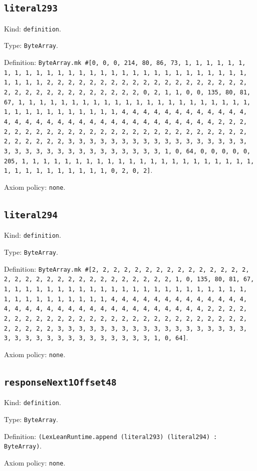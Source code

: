 \documentclass[11pt]{article}
\begin{document}
\subsection*{\texttt{literal293}}
\noindent Kind: \texttt{definition}.\par
\noindent Type: \texttt{ByteArray}.\par
\noindent Definition: \texttt{ByteArray.mk \#[0, 0, 0, 214, 80, 86, 73, 1, 1, 1, 1, 1, 1, 1, 1, 1, 1, 1, 1, 1, 1, 1, 1, 1, 1, 1, 1, 1, 1, 1, 1, 1, 1, 1, 1, 1, 1, 1, 1, 1, 2, 2, 2, 2, 2, 2, 2, 2, 2, 2, 2, 2, 2, 2, 2, 2, 2, 2, 2, 2, 2, 2, 2, 2, 2, 2, 2, 2, 2, 2, 2, 2, 0, 2, 1, 1, 0, 0, 135, 80, 81, 67, 1, 1, 1, 1, 1, 1, 1, 1, 1, 1, 1, 1, 1, 1, 1, 1, 1, 1, 1, 1, 1, 1, 1, 1, 1, 1, 1, 1, 1, 1, 1, 1, 1, 4, 4, 4, 4, 4, 4, 4, 4, 4, 4, 4, 4, 4, 4, 4, 4, 4, 4, 4, 4, 4, 4, 4, 4, 4, 4, 4, 4, 4, 4, 4, 4, 2, 2, 2, 2, 2, 2, 2, 2, 2, 2, 2, 2, 2, 2, 2, 2, 2, 2, 2, 2, 2, 2, 2, 2, 2, 2, 2, 2, 2, 2, 2, 2, 3, 3, 3, 3, 3, 3, 3, 3, 3, 3, 3, 3, 3, 3, 3, 3, 3, 3, 3, 3, 3, 3, 3, 3, 3, 3, 3, 3, 3, 3, 3, 3, 1, 0, 64, 0, 0, 0, 0, 0, 205, 1, 1, 1, 1, 1, 1, 1, 1, 1, 1, 1, 1, 1, 1, 1, 1, 1, 1, 1, 1, 1, 1, 1, 1, 1, 1, 1, 1, 1, 1, 1, 1, 0, 2, 0, 2]}.\par
\noindent Axiom policy: \texttt{none}.\par
\subsection*{\texttt{literal294}}
\noindent Kind: \texttt{definition}.\par
\noindent Type: \texttt{ByteArray}.\par
\noindent Definition: \texttt{ByteArray.mk \#[2, 2, 2, 2, 2, 2, 2, 2, 2, 2, 2, 2, 2, 2, 2, 2, 2, 2, 2, 2, 2, 2, 2, 2, 2, 2, 2, 2, 2, 2, 2, 1, 0, 135, 80, 81, 67, 1, 1, 1, 1, 1, 1, 1, 1, 1, 1, 1, 1, 1, 1, 1, 1, 1, 1, 1, 1, 1, 1, 1, 1, 1, 1, 1, 1, 1, 1, 1, 1, 1, 4, 4, 4, 4, 4, 4, 4, 4, 4, 4, 4, 4, 4, 4, 4, 4, 4, 4, 4, 4, 4, 4, 4, 4, 4, 4, 4, 4, 4, 4, 4, 4, 2, 2, 2, 2, 2, 2, 2, 2, 2, 2, 2, 2, 2, 2, 2, 2, 2, 2, 2, 2, 2, 2, 2, 2, 2, 2, 2, 2, 2, 2, 2, 2, 3, 3, 3, 3, 3, 3, 3, 3, 3, 3, 3, 3, 3, 3, 3, 3, 3, 3, 3, 3, 3, 3, 3, 3, 3, 3, 3, 3, 3, 3, 3, 3, 1, 0, 64]}.\par
\noindent Axiom policy: \texttt{none}.\par
\subsection*{\texttt{responseNext1Offset48}}
\noindent Kind: \texttt{definition}.\par
\noindent Type: \texttt{ByteArray}.\par
\noindent Definition: \texttt{(LexLeanRuntime.append (literal293) (literal294) : ByteArray)}.\par
\noindent Axiom policy: \texttt{none}.\par
\end{document}
